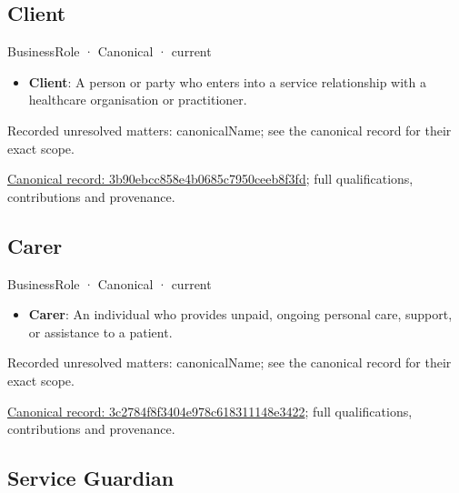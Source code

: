 \subsection{Client}

\label{element:3b90ebcc858e4b0685c7950ceeb8f3fd}
{\small BusinessRole · Canonical · current}\par

\begin{itemize}


\item \textbf{Client}: A person or party who enters into a service relationship with a healthcare organisation or practitioner.

\end{itemize}

{\small Recorded unresolved matters: canonicalName; see the canonical record for their exact scope.}\par
{\footnotesize \href{../../../../continuum/business/business-role/3b90ebcc858e4b0685c7950ceeb8f3fd.md}{Canonical record: 3b90ebcc858e4b0685c7950ceeb8f3fd}; full qualifications, contributions and provenance.}\par
\subsection{Carer}

\label{element:3c2784f8f3404e978c618311148e3422}
{\small BusinessRole · Canonical · current}\par

\begin{itemize}


\item \textbf{Carer}: An individual who provides unpaid, ongoing personal care, support, or assistance to a patient.

\end{itemize}

{\small Recorded unresolved matters: canonicalName; see the canonical record for their exact scope.}\par
{\footnotesize \href{../../../../continuum/business/business-role/3c2784f8f3404e978c618311148e3422.md}{Canonical record: 3c2784f8f3404e978c618311148e3422}; full qualifications, contributions and provenance.}\par
\subsection{Service Guardian}

